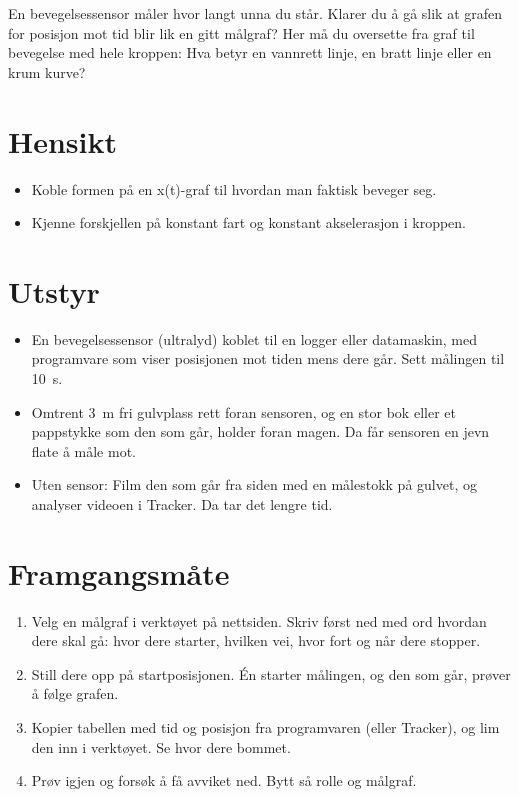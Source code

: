 \documentclass[11pt]{article}
\begin{document}

En bevegelsessensor måler hvor langt unna du står. Klarer du å gå slik at grafen for posisjon mot tid blir lik en gitt målgraf? Her må du oversette fra graf til bevegelse med hele kroppen: Hva betyr en vannrett linje, en bratt linje eller en krum kurve?

\section*{Hensikt}

\begin{itemize}
\item Koble formen på en x(t)-graf til hvordan man faktisk beveger seg.
\item Kjenne forskjellen på konstant fart og konstant akselerasjon i kroppen.
\end{itemize}

\section*{Utstyr}

\begin{itemize}
\item En bevegelsessensor (ultralyd) koblet til en logger eller datamaskin, med programvare som viser posisjonen mot tiden mens dere går. Sett målingen til 10~s.
\item Omtrent 3~m fri gulvplass rett foran sensoren, og en stor bok eller et pappstykke som den som går, holder foran magen. Da får sensoren en jevn flate å måle mot.
\item Uten sensor: Film den som går fra siden med en målestokk på gulvet, og analyser videoen i Tracker. Da tar det lengre tid.
\end{itemize}

\section*{Framgangsmåte}

\begin{enumerate}
\item Velg en målgraf i verktøyet på nettsiden. Skriv først ned med ord hvordan dere skal gå: hvor dere starter, hvilken vei, hvor fort og når dere stopper.
\item Still dere opp på startposisjonen. Én starter målingen, og den som går, prøver å følge grafen.
\item Kopier tabellen med tid og posisjon fra programvaren (eller Tracker), og lim den inn i verktøyet. Se hvor dere bommet.
\item Prøv igjen og forsøk å få avviket ned. Bytt så rolle og målgraf.
\end{enumerate}
\end{document}
